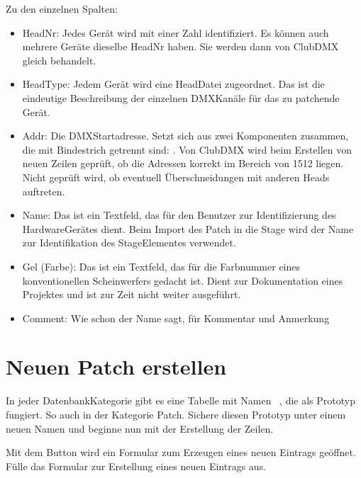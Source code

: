 \documentclass[letterpaper,10pt,ngerman]{sphinxmanual}
\begin{document}
Zu den einzelnen Spalten:
\begin{itemize}
\item {} 
HeadNr: Jedes Gerät wird mit einer Zahl identifiziert.
Es können auch mehrere Geräte dieselbe HeadNr haben.
Sie werden dann von ClubDMX gleich behandelt.

\item {} 
HeadType: Jedem Gerät wird eine Head\sphinxhyphen{}Datei zugeordnet.
Das ist die eindeutige Beschreibung der einzelnen DMX\sphinxhyphen{}Kanäle
für das zu patchende Gerät.

\item {} 
Addr: Die DMX\sphinxhyphen{}Startadresse. Setzt sich aus zwei Komponenten zusammen,
die mit Bindestrich getrennt sind: .
Von ClubDMX wird beim Erstellen von neuen Zeilen geprüft,
ob die Adressen korrekt im Bereich von 1\sphinxhyphen{}512 liegen.
Nicht geprüft wird, ob eventuell Überschneidungen mit anderen Heads
auftreten.

\item {} 
Name: Das ist ein Textfeld, das für den Benutzer zur
Identifizierung des Hardware\sphinxhyphen{}Gerätes dient. Beim Import des Patch
in die Stage wird der Name zur Identifikation des Stage\sphinxhyphen{}Elementes
verwendet.

\item {} 
Gel (Farbe): Das ist ein Textfeld, das für die Farbnummer eines
konventionellen Scheinwerfers gedacht ist. Dient zur Dokumentation eines
Projektes und ist zur Zeit nicht weiter ausgeführt.

\item {} 
Comment: Wie schon der Name sagt, für Kommentar und Anmerkung

\end{itemize}


\section{Neuen Patch erstellen}
\label{\detokenize{patch:neuen-patch-erstellen}}\label{\detokenize{patch:neupatchlabel}}
In jeder Datenbank\sphinxhyphen{}Kategorie gibt es eine Tabelle mit Namen  ,
die als Prototyp fungiert. So auch in der Kategorie Patch.
Sichere diesen Prototyp unter einem neuen Namen und beginne
nun mit der Erstellung der Zeilen.

Mit dem Button  wird ein Formular zum Erzeugen
eines neuen Eintrags geöffnet. Fülle das Formular zur
Erstellung eines neuen Eintrags aus.
\end{document}
